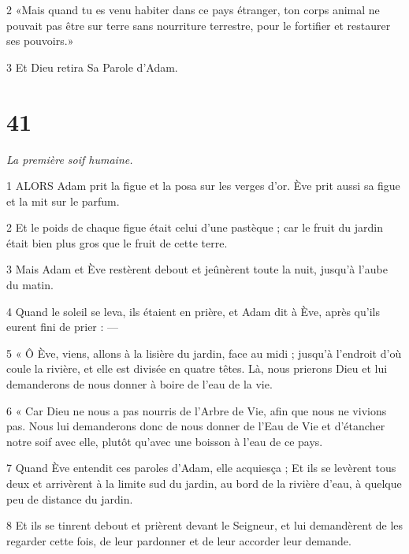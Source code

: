 \par 2 «Mais quand tu es venu habiter dans ce pays étranger, ton corps animal ne pouvait pas être sur terre sans nourriture terrestre, pour le fortifier et restaurer ses pouvoirs.»

\par 3 Et Dieu retira Sa Parole d'Adam.

\chapter{41}

\par \textit{La première soif humaine.}

\par 1 ALORS Adam prit la figue et la posa sur les verges d'or. Ève prit aussi sa figue et la mit sur le parfum.

\par 2 Et le poids de chaque figue était celui d'une pastèque ; car le fruit du jardin était bien plus gros que le fruit de cette terre.

\par 3 Mais Adam et Ève restèrent debout et jeûnèrent toute la nuit, jusqu'à l'aube du matin.

\par 4 Quand le soleil se leva, ils étaient en prière, et Adam dit à Ève, après qu'ils eurent fini de prier : —

\par 5 « Ô Ève, viens, allons à la lisière du jardin, face au midi ; jusqu'à l'endroit d'où coule la rivière, et elle est divisée en quatre têtes. Là, nous prierons Dieu et lui demanderons de nous donner à boire de l'eau de la vie.

\par 6 « Car Dieu ne nous a pas nourris de l'Arbre de Vie, afin que nous ne vivions pas. Nous lui demanderons donc de nous donner de l’Eau de Vie et d’étancher notre soif avec elle, plutôt qu’avec une boisson à l’eau de ce pays.

\par 7 Quand Ève entendit ces paroles d'Adam, elle acquiesça ; Et ils se levèrent tous deux et arrivèrent à la limite sud du jardin, au bord de la rivière d'eau, à quelque peu de distance du jardin.

\par 8 Et ils se tinrent debout et prièrent devant le Seigneur, et lui demandèrent de les regarder cette fois, de leur pardonner et de leur accorder leur demande.

